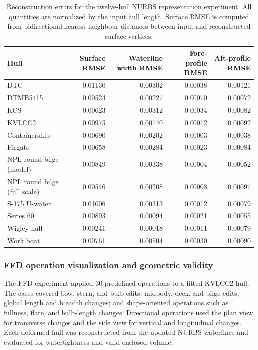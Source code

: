 \documentclass[a4paper,fleqn]{cas-dc}
\begin{document}
\begin{table}[t]
\caption{Reconstruction errors for the twelve-hull NURBS representation
experiment. All quantities are normalized by the input hull length. Surface RMSE
is computed from bidirectional nearest-neighbour distances between input and
reconstructed surface vertices.}
\label{tab:reconstruction-error}
\centering
\begin{tabular*}{\tblwidth}{@{\extracolsep{\fill}}lrrrr@{}}
\toprule
Hull & Surface RMSE & Waterline width RMSE & Fore-profile RMSE & Aft-profile RMSE \\
\midrule
DTC                         & 0.01130 & 0.00302 & 0.00038 & 0.00121 \\
DTMB5415                    & 0.00524 & 0.00227 & 0.00070 & 0.00072 \\
KCS                         & 0.00623 & 0.00312 & 0.00034 & 0.00082 \\
KVLCC2                      & 0.00975 & 0.00140 & 0.00012 & 0.00092 \\
Containership               & 0.00690 & 0.00202 & 0.00003 & 0.00038 \\
Firgate                     & 0.00658 & 0.00284 & 0.00023 & 0.00084 \\
NPL round bilge (model)     & 0.00849 & 0.00338 & 0.00004 & 0.00052 \\
NPL round bilge (full scale)& 0.00546 & 0.00208 & 0.00008 & 0.00097 \\
S-175 U-water               & 0.01006 & 0.00313 & 0.00012 & 0.00079 \\
Series 60                   & 0.00893 & 0.00094 & 0.00021 & 0.00055 \\
Wigley hull                 & 0.00241 & 0.00018 & 0.00011 & 0.00079 \\
Work boat                   & 0.00761 & 0.00504 & 0.00030 & 0.00090 \\
\bottomrule
\end{tabular*}
\end{table}

\subsubsection{FFD operation visualization and geometric validity}
\label{sec:ffd-results}

The FFD experiment applied 30 predefined operations to a fitted KVLCC2 hull. The
cases covered bow, stern, and bulb edits; midbody, deck, and bilge edits; global
length and breadth changes; and shape-oriented operations such as fullness, flare,
and bulb-length changes. Directional operations used the plan view for transverse
changes and the side view for vertical and longitudinal changes. Each deformed hull
was reconstructed from the updated NURBS waterlines and evaluated for watertightness
and valid enclosed volume.
\end{document}
